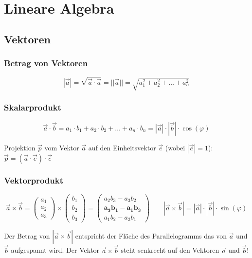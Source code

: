 \section{Lineare Algebra}

\subsection{Vektoren}

\subsubsection{Betrag von Vektoren}
\[ 
	|\vec{a}| = \sqrt{\vec{a} \cdot \vec{a}} = ||\vec{a}|| =\sqrt{a_1^2 + a_2^2 + \ldots + a_n^2}
\]

	
\subsubsection{Skalarprodukt}
\[ 
	\vec{a} \cdot \vec{b} = a_1 \cdot b_1 + a_2 \cdot b_2 + \ldots +a_n \cdot b_n = |\vec{a}| \cdot |\vec{b}| \cdot \cos(\varphi)
\]
			
Projektion $\vec{p}$ vom Vektor $\vec{a}$ auf den Einheitsvektor $\vec{e}$ (wobei $|\vec{e}|=1$): \hspace{1cm} $\vec{p}=(\vec{a} \cdot \vec{e}) \cdot \vec{e}$


\subsubsection{Vektorprodukt}
\[
	\vec{a} \times \vec{b} = 
	\begin{pmatrix}a_1\\a_2\\a_3 \end{pmatrix} \times 
	\begin{pmatrix}b_1\\b_2\\b_3 \end{pmatrix} = 
	\begin{pmatrix}
	a_2 b_3 - a_3 b_2 \\ \mathbf{a_3 b_1 -  a_1 b_3} \\ a_1 b_2 - a_2 b_1 
	\end{pmatrix} \quad \quad 
	|\vec{a} \times \vec{b}|=|\vec{a}| \cdot |\vec{b}| \cdot
	\sin(\varphi)
\]

Der Betrag von $|\vec{a} \times \vec{b}|$ entspricht der Fläche des
Parallelogramms das von $\vec{a}$ und $\vec{b}$ aufgespannt wird. Der Vektor  $\vec{a} \times \vec{b}$ steht senkrecht auf den Vektoren $\vec{a}$ und $\vec{b}$!


